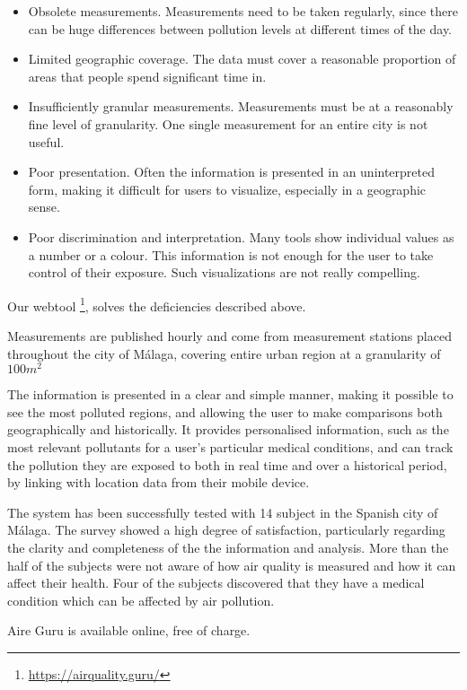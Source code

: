 \begin{itemize}

\item Obsolete measurements. Measurements need to be taken regularly, since there can be huge differences
between pollution levels at different times of the day.

\item Limited geographic coverage. The data must cover a reasonable proportion of areas that people spend significant time in.

\item Insufficiently granular measurements. Measurements must be at a reasonably fine level of granularity. One single measurement for an entire city is not useful.

\item Poor presentation. Often the information is presented in an uninterpreted form, making it difficult for users to visualize, especially in a geographic sense.

\item Poor discrimination and interpretation. Many tools show individual values as a number or a colour. This information is not
enough for the user to take control of their exposure. Such visualizations are not really compelling. 

\end{itemize}

Our webtool \footnote{\url{https://airquality.guru/}}, solves the deficiencies described above.

Measurements are published hourly and come from measurement stations placed throughout the 
city of Málaga, covering entire urban region at a granularity of $100m^2$

The information is presented in a clear and simple manner, making it possible to see the most polluted regions,
and allowing the user to make comparisons both geographically and historically. It provides personalised information, such as the most relevant pollutants for a user's particular medical conditions, and can track
the pollution they are exposed to both in real time and over a historical period, by linking with location data from their mobile device. 

The system has been successfully tested with 14 subject in the Spanish city of Málaga. The survey showed a high degree of satisfaction, particularly regarding the clarity and completeness of the the information and analysis.
More than the half of the subjects were not aware of how air quality is measured and how it 
can affect their health. Four of the subjects discovered that they have a medical 
condition which can be affected by air pollution.
    
Aire Guru is available online, free of charge.
